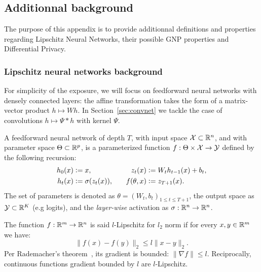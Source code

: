 \subsection{Additionnal background}

The purpose of this appendix is to provide additionnal definitions and properties regarding Lipschitz Neural Networks, their possible GNP properties and Differential Privacy.

    \subsubsection{Lipschitz neural networks background}\label{sec:lipdefs}
    
    For simplicity of the exposure, we will focus on feedforward neural networks with densely connected layers: the affine transformation takes the form of a matrix-vector product $h\mapsto Wh$. In Section~\ref{sec:convnet} we tackle the case of convolutions $h\mapsto\Psi*h$ with kernel $\Psi$.  

    \begin{definition}\label{def:feedforward} 
        A feedforward neural network of depth $T$, with input space $\mathcal{X}\subset\mathbb{R}^n$, and with parameter space $\Theta\subset \mathbb{R}^p$, is a parameterized function $f:\Theta\times\mathcal{X}\rightarrow\mathcal{Y}$ defined by the following recursion:
        \begin{align}
            h_0(x) &\vcentcolon= x,\quad &
            z_t(x) &\vcentcolon= W_th_{t-1}(x)+b_t,\nonumber \\
            h_t(x) &\vcentcolon= \sigma(z_t(x)),\quad &
            f(\theta,x) &\vcentcolon= z_{T+1}(x).
        \end{align}
        The set of parameters is denoted as $\theta=(W_t,b_t)_{1\leq t\leq T+1}$, the output space as $\mathcal{Y}\subset\mathbb{R}^K$ (e.g logits), and the \textit{layer-wise} activation as $\sigma:\mathbb{R}^n\rightarrow\mathbb{R}^n$. 
    \end{definition}

    \begin{definition}\label{def:lipconstant}
        The function $f:\mathbb{R}^m\rightarrow\mathbb{R}^n$ is said $l$-Lipschitz for $l_2$ norm if for every $x,y\in\mathbb{R}^m$ we have:
            \begin{equation}
                \|f(x)-f(y)\|_2 \leq l\|x-y\|_2.%
            \end{equation}
        Per Rademacher's theorem~\cite{simon1983lectures}, its gradient is bounded: $\|\nabla f\|\leq l$. Reciprocally, continuous functions gradient bounded by $l$ are $l$-Lipschitz.  
    \end{definition}

